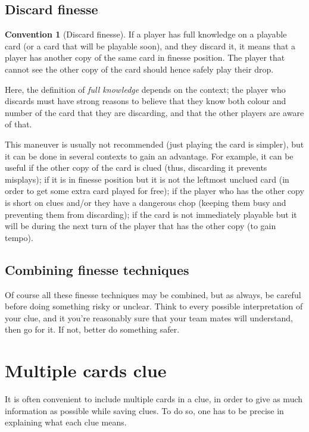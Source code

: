\documentclass[a4paper]{article}
\theoremstyle{plain}
\theoremstyle{definition}
\newtheorem{convention}[theorem]{Convention}
\begin{document}
\subsection{Discard finesse}

\begin{convention}[Discard finesse]
	If a player has full knowledge on a playable card (or a card that will be playable soon), and they discard it, it means that a player has another copy of the same card in finesse position. The player that cannot see the other copy of the card should hence safely play their drop.
\end{convention}

Here, the definition of \emph{full knowledge} depends on the context; the player who discards must have strong reasons to believe that they know both colour and number of the card that they are discarding, and that the other players are aware of that.

This maneuver is usually not recommended (just playing the card is simpler), but it can be done in several contexts to gain an advantage. For example, it can be useful if the other copy of the card is clued (thus, discarding it prevents misplays); if it is in finesse position but it is not the leftmost unclued card (in order to get some extra card played for free); if the player who has the other copy is short on clues and/or they have a dangerous chop (keeping them busy and preventing them from discarding); if the card is not immediately playable but it will be during the next turn of the player that has the other copy (to gain tempo).

\subsection{Combining finesse techniques}

Of course all these finesse techniques may be combined, but as always, be careful before doing something risky or unclear. Think to every possible interpretation of your clue, and it you're reasonably sure that your team mates will understand, then go for it. If not, better do something safer.

\section{Multiple cards clue}

It is often convenient to include multiple cards in a clue, in order to give as much information as possible while saving clues. To do so, one has to be precise in explaining what each clue means.
\end{document}
